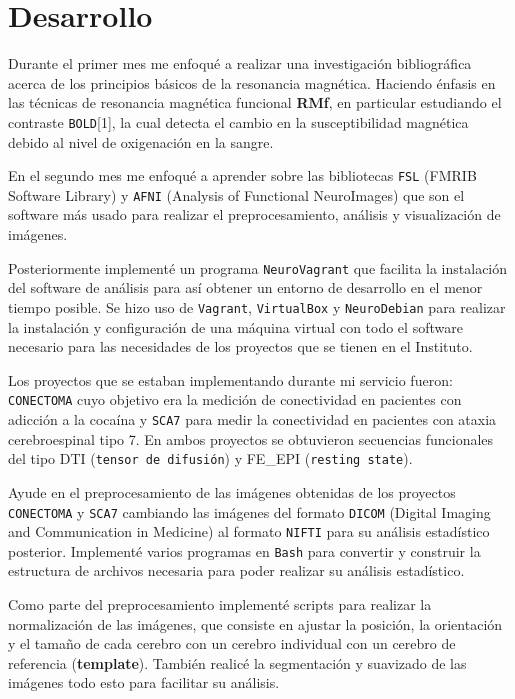 \documentclass{article}
\begin{document}
\section{Desarrollo}
Durante el primer mes me enfoqué a realizar una investigación bibliográfica acerca de los principios básicos de la resonancia magnética. Haciendo énfasis en las técnicas de resonancia magnética funcional \textbf{RMf}, en particular estudiando el contraste \texttt{BOLD}[1], la cual detecta el cambio en la susceptibilidad magnética debido al nivel de oxigenación en la sangre.

En el segundo mes me enfoqué a aprender sobre las bibliotecas \texttt{FSL} (FMRIB Software Library) y \texttt{AFNI} (Analysis of Functional NeuroImages) que son el software más usado para realizar el preprocesamiento, análisis y visualización de imágenes.

Posteriormente implementé un programa \texttt{NeuroVagrant} que facilita la instalación del software de análisis para así obtener un entorno de desarrollo en el menor tiempo posible. Se hizo uso de \texttt{Vagrant}, \texttt{VirtualBox} y \texttt{NeuroDebian} para realizar la instalación y configuración de una máquina virtual con todo el software necesario para las necesidades de los proyectos que se tienen en el Instituto.

Los proyectos que se estaban implementando durante mi servicio fueron: \texttt{CONECTOMA} cuyo objetivo era la medición de conectividad en pacientes con adicción a la cocaína y \texttt{SCA7} para medir la conectividad en pacientes con ataxia cerebroespinal tipo 7. En ambos proyectos se obtuvieron secuencias funcionales del tipo DTI (\texttt{tensor de difusión}) y FE\_EPI (\texttt{resting state}).

Ayude en el preprocesamiento de las imágenes obtenidas de los proyectos \texttt{CONECTOMA} y \texttt{SCA7} cambiando las imágenes del formato \texttt{DICOM} (Digital Imaging and Communication in Medicine) al formato \texttt{NIFTI} para su análisis estadístico posterior. Implementé varios programas en \texttt{Bash} para convertir y construir la estructura de archivos necesaria para poder realizar su análisis estadístico.

Como parte del preprocesamiento implementé scripts para realizar la normalización de las imágenes, que consiste en ajustar la posición, la orientación y el tamaño de cada cerebro con un cerebro individual con un cerebro de referencia (\textbf{template}). También realicé la segmentación y suavizado de las imágenes todo esto para facilitar su análisis. 
\end{document}
